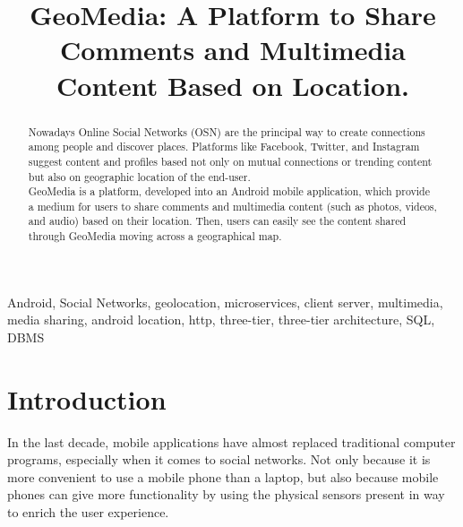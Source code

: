 \documentclass[conference]{IEEEtran}
\begin{document}
\title{GeoMedia: A Platform to Share Comments and Multimedia Content Based on Location.\\
}

\author{
\and
{}
}

\maketitle

\begin{abstract}
Nowadays Online Social Networks (OSN) are the principal way to create connections among people and discover places.
Platforms like Facebook, Twitter, and Instagram suggest content and profiles based not only on mutual connections or trending content but also on geographic location of the end-user.
\\
GeoMedia is a platform, developed into an Android mobile application, which provide a medium for users to share comments and multimedia content (such as photos, videos, and audio) based on their location.
Then, users can easily see the content shared through GeoMedia moving across a geographical map.
\end{abstract}

\begin{IEEEkeywords}
Android, Social Networks, geolocation, microservices, client server, multimedia, media sharing, android location, http, three-tier, three-tier architecture, SQL, DBMS
\end{IEEEkeywords}

\section{Introduction}
In the last decade, mobile applications have almost replaced traditional computer programs, especially when it comes to social networks. Not only because it is more convenient to use a mobile phone than a laptop, but also because mobile phones can give more functionality by using the physical sensors present in way to enrich the user experience.
\end{document}
